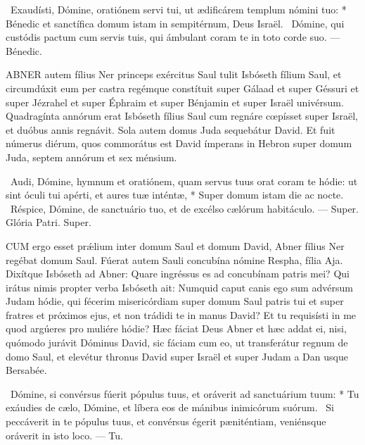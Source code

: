 \R\ Exaudísti, Dómine, oratiónem servi tui, ut ædificárem templum nómini tuo: * Bénedic et sanctífica domum istam in sempitérnum, Deus Israël. \V\ Dómine, qui custódis pactum cum servis tuis, qui ámbulant coram te in toto corde suo. --- Bénedic.



\lettrine[lines=2]{A}{BNER} autem fílius Ner princeps exércitus Saul tulit Isbóseth fílium Saul, et circumdúxit eum per castra regémque constítuit super Gálaad et super Géssuri et super Jézrahel et super Éphraim et super Bénjamin et super Israël univérsum. Quadragínta annórum erat Isbóseth fílius Saul cum regnáre cœpísset super Israël, et duóbus annis regnávit. Sola autem domus Juda sequebátur David. Et fuit númerus diérum, quos commorátus est David ímperans in Hebron super domum Juda, septem annórum et sex ménsium.

\R\ Audi, Dómine, hymnum et oratiónem, quam servus tuus orat coram te hódie: ut sint óculi tui apérti, et aures tuæ inténtæ, * Super domum istam die ac nocte. \V\ Réspice, Dómine, de sanctuário tuo, et de excélso cælórum habitáculo. --- Super. Glória Patri. Super.




\lettrine[lines=2]{C}{UM} ergo esset prǽlium inter domum Saul et domum David, Abner fílius Ner regébat domum Saul. Fúerat autem Sauli concubína nómine Respha, fília Aja. Dixítque Isbóseth ad Abner: Quare ingréssus es ad concubínam patris mei? Qui irátus nimis propter verba Isbóseth ait: Numquid caput canis ego sum advérsum Judam hódie, qui fécerim misericórdiam super domum Saul patris tui et super fratres et próximos ejus, et non trádidi te in manus David? Et tu requisísti in me quod argúeres pro muliére hódie? Hæc fáciat Deus Abner et hæc addat ei, nisi, quómodo jurávit Dóminus David, sic fáciam cum eo, ut transferátur regnum de domo Saul, et elevétur thronus David super Israël et super Judam a Dan usque Bersabée.

\R\ Dómine, si convérsus fúerit pópulus tuus, et oráverit ad sanctuárium tuum: * Tu exáudies de cælo, Dómine, et líbera eos de mánibus inimicórum suórum. \V\ Si peccáverit in te pópulus tuus, et convérsus égerit pæniténtiam, veniénsque oráverit in isto loco. --- Tu.

